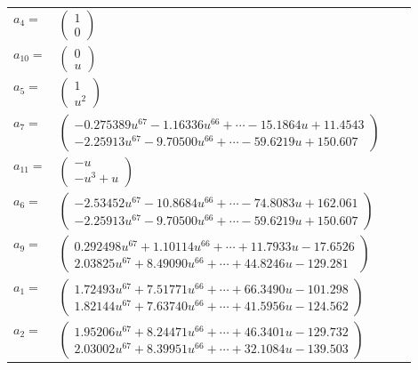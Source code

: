 \documentclass[1p]{elsarticle_modified}
\theoremstyle{definition}
\begin{document}
\begin{tabular}{m{7pt} m{180pt} m{7pt} m{180pt} }
\flushright $a_{4}=$&$\begin{pmatrix}1\\0\end{pmatrix}$ \\
\flushright $a_{10}=$&$\begin{pmatrix}0\\u\end{pmatrix}$ \\
\flushright $a_{5}=$&$\begin{pmatrix}1\\u^2\end{pmatrix}$ \\
\flushright $a_{7}=$&$\begin{pmatrix}-0.275389 u^{67}-1.16336 u^{66}+\cdots-15.1864 u+11.4543\\-2.25913 u^{67}-9.70500 u^{66}+\cdots-59.6219 u+150.607\end{pmatrix}$ \\
\flushright $a_{11}=$&$\begin{pmatrix}- u\\- u^3+u\end{pmatrix}$ \\
\flushright $a_{6}=$&$\begin{pmatrix}-2.53452 u^{67}-10.8684 u^{66}+\cdots-74.8083 u+162.061\\-2.25913 u^{67}-9.70500 u^{66}+\cdots-59.6219 u+150.607\end{pmatrix}$ \\
\flushright $a_{9}=$&$\begin{pmatrix}0.292498 u^{67}+1.10114 u^{66}+\cdots+11.7933 u-17.6526\\2.03825 u^{67}+8.49090 u^{66}+\cdots+44.8246 u-129.281\end{pmatrix}$ \\
\flushright $a_{1}=$&$\begin{pmatrix}1.72493 u^{67}+7.51771 u^{66}+\cdots+66.3490 u-101.298\\1.82144 u^{67}+7.63740 u^{66}+\cdots+41.5956 u-124.562\end{pmatrix}$ \\
\flushright $a_{2}=$&$\begin{pmatrix}1.95206 u^{67}+8.24471 u^{66}+\cdots+46.3401 u-129.732\\2.03002 u^{67}+8.39951 u^{66}+\cdots+32.1084 u-139.503\end{pmatrix}$ \\

\end{tabular}
\end{document}
